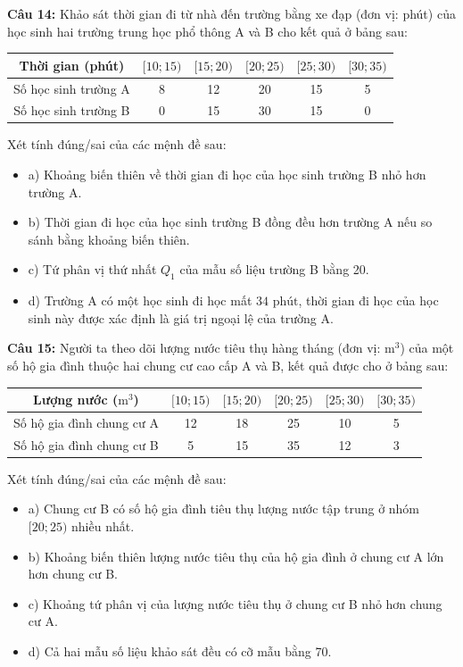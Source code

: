 \documentclass[12pt]{article}
\begin{document}
	\vspace{4mm}
	
	\noindent \textbf{Câu 14:} Khảo sát thời gian đi từ nhà đến trường bằng xe đạp (đơn vị: phút) của học sinh hai trường trung học phổ thông A và B cho kết quả ở bảng sau:
	\begin{center}
		\renewcommand{\arraystretch}{1.3}
		\begin{tabular}{|c|c|c|c|c|c|}
			\hline
			Thời gian (phút) & $[10; 15)$ & $[15; 20)$ & $[20; 25)$ & $[25; 30)$ & $[30; 35)$ \\
			\hline
			Số học sinh trường A & 8 & 12 & 20 & 15 & 5 \\
			\hline
			Số học sinh trường B & 0 & 15 & 30 & 15 & 0 \\
			\hline
		\end{tabular}
	\end{center}
	Xét tính đúng/sai của các mệnh đề sau:
	\begin{itemize}[label=, leftmargin=*]
		\item a) Khoảng biến thiên về thời gian đi học của học sinh trường B nhỏ hơn trường A.
		\item b) Thời gian đi học của học sinh trường B đồng đều hơn trường A nếu so sánh bằng khoảng biến thiên.
		\item c) Tứ phân vị thứ nhất $Q_1$ của mẫu số liệu trường B bằng 20.
		\item d) Trường A có một học sinh đi học mất $34\text{ phút}$, thời gian đi học của học sinh này được xác định là giá trị ngoại lệ của trường A.
	\end{itemize}
	
	\vspace{4mm}
	
	\noindent \textbf{Câu 15:} Người ta theo dõi lượng nước tiêu thụ hàng tháng (đơn vị: $\text{m}^3$) của một số hộ gia đình thuộc hai chung cư cao cấp A và B, kết quả được cho ở bảng sau:
	\begin{center}
		\renewcommand{\arraystretch}{1.3}
		\begin{tabular}{|c|c|c|c|c|c|}
			\hline
			Lượng nước ($\text{m}^3$) & $[10; 15)$ & $[15; 20)$ & $[20; 25)$ & $[25; 30)$ & $[30; 35)$ \\
			\hline
			Số hộ gia đình chung cư A & 12 & 18 & 25 & 10 & 5 \\
			\hline
			Số hộ gia đình chung cư B & 5 & 15 & 35 & 12 & 3 \\
			\hline
		\end{tabular}
	\end{center}
	Xét tính đúng/sai của các mệnh đề sau:
	\begin{itemize}[label=, leftmargin=*]
		\item a) Chung cư B có số hộ gia đình tiêu thụ lượng nước tập trung ở nhóm $[20; 25)$ nhiều nhất.
		\item b) Khoảng biến thiên lượng nước tiêu thụ của hộ gia đình ở chung cư A lớn hơn chung cư B.
		\item c) Khoảng tứ phân vị của lượng nước tiêu thụ ở chung cư B nhỏ hơn chung cư A.
		\item d) Cả hai mẫu số liệu khảo sát đều có cỡ mẫu bằng 70.
	\end{itemize}
	
\end{document}
